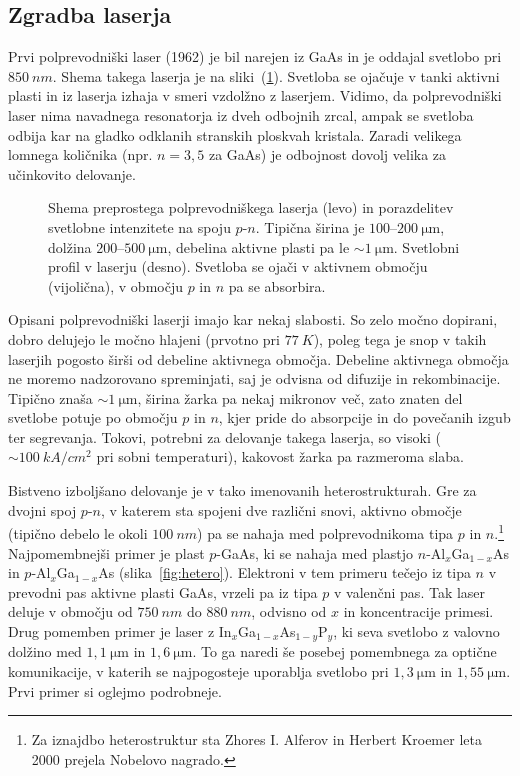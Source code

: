\subsection*{Zgradba laserja}
Prvi polprevodniški laser (1962) je bil narejen iz GaAs in je oddajal svetlobo 
pri $850~\si{nm}$. Shema takega laserja je na sliki~(\ref{fig:pnshema}). Svetloba se ojačuje
v tanki aktivni plasti in iz laserja izhaja v smeri vzdolžno z laserjem. 
Vidimo, da polprevodniški laser nima navadnega resonatorja iz dveh odbojnih zrcal,
ampak se svetloba odbija kar na gladko odklanih stranskih ploskvah kristala. Zaradi
velikega lomnega količnika (npr. $n=3,5$ za GaAs) je odbojnost dovolj velika
za učinkovito delovanje.
\begin{figure}[h]
\centering
\def\svgwidth{130truemm} 

\caption{Shema preprostega polprevodniškega laserja (levo) in porazdelitev svetlobne
intenzitete na spoju $p$-$n$. Tipična širina je $100$--$200~\si{\micro\metre}$, 
dolžina $200$--$500~\si{\micro\metre}$, debelina aktivne plasti pa le $\sim 1~\si{\micro\metre}$. 
Svetlobni profil v laserju (desno). Svetloba 
se ojači v aktivnem območju (vijolična), v območju $p$ in $n$ pa se absorbira.
}
\label{fig:pnshema}
\end{figure}

Opisani polprevodniški laserji imajo kar nekaj slabosti. So zelo močno dopirani, 
dobro delujejo le močno hlajeni (prvotno pri $77~\si{K}$), poleg tega je snop 
v takih laserjih pogosto širši od debeline aktivnega območja. Debeline
aktivnega območja ne moremo nadzorovano spreminjati, saj je odvisna od difuzije in rekombinacije. 
Tipično znaša $\sim 1~\si{\micro\meter}$, širina žarka pa nekaj mikronov več, zato
znaten del svetlobe potuje po območju $p$ in $n$, kjer pride do 
absorpcije in do povečanih izgub ter segrevanja. Tokovi, potrebni za 
delovanje takega laserja, so visoki ($\sim 100~\si{kA}/\si{cm}^2$ pri sobni temperaturi), 
kakovost žarka pa razmeroma slaba. 

Bistveno izboljšano delovanje je v tako imenovanih heterostrukturah. Gre za dvojni spoj $p$-$n$, 
v katerem sta spojeni dve različni snovi, aktivno območje (tipično debelo le okoli $100~\si{nm}$) 
pa se nahaja med polprevodnikoma tipa $p$ in $n$.\footnote{Za 
iznajdbo heterostruktur sta Zhores I. Alferov in Herbert Kroemer leta 2000 prejela Nobelovo nagrado.}
Najpomembnejši primer je plast $p$-GaAs, ki se nahaja med plastjo  
$n$-Al$_x$Ga$_{1-x}$As in $p$-Al$_x$Ga$_{1-x}$As 
(slika~\ref{fig:hetero}). Elektroni v tem primeru tečejo iz tipa $n$ v prevodni pas aktivne plasti
GaAs, vrzeli pa iz tipa $p$ v valenčni pas. 
Tak laser deluje v območju od $750~\si{nm}$ do $880~\si{nm}$, odvisno od $x$ in koncentracije primesi.
Drug pomemben primer je laser z In$_{x}$Ga$_{1-x}$As$_{1-y}$P$_y$, ki seva svetlobo z valovno 
dolžino med $1,1~\si{\micro\metre}$ in $1,6~\si{\micro\metre}$. To ga naredi še posebej pomembnega za optične
komunikacije, v katerih se najpogosteje uporablja svetlobo pri $1,3~\si{\micro\meter}$ in $1,55~\si{\micro\meter}$. 
Prvi primer si oglejmo podrobneje.


